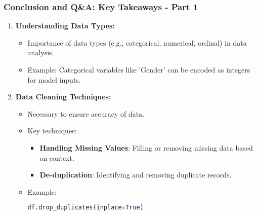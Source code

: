 \documentclass[aspectratio=169]{beamer}
\begin{document}
\begin{frame}[fragile]
  \frametitle{Conclusion and Q\&A: Key Takeaways - Part 1}
  \begin{enumerate}
    \item \textbf{Understanding Data Types:}
      \begin{itemize}
        \item Importance of data types (e.g., categorical, numerical, ordinal) in data analysis.
        \item Example: Categorical variables like 'Gender' can be encoded as integers for model inputs.
      \end{itemize}

    \item \textbf{Data Cleaning Techniques:}
      \begin{itemize}
        \item Necessary to ensure accuracy of data.
        \item Key techniques:
          \begin{itemize}
            \item \textbf{Handling Missing Values}: Filling or removing missing data based on context.
            \item \textbf{De-duplication}: Identifying and removing duplicate records.
          \end{itemize}
        \item Example: 
        \begin{lstlisting}[language=Python]
        df.drop_duplicates(inplace=True)
        \end{lstlisting}
      \end{itemize}
  \end{enumerate}
\end{frame}
\end{document}
